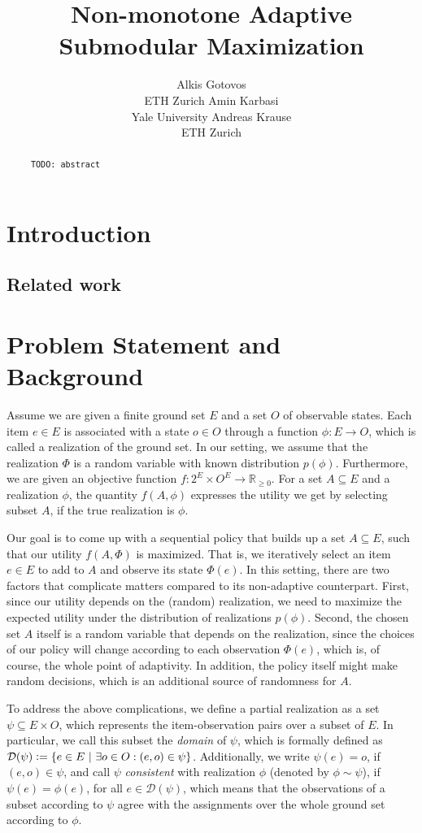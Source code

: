 \documentclass{article}
\title{Non-monotone Adaptive Submodular Maximization}
\author{Alkis Gotovos\\
ETH Zurich
\And
Amin Karbasi\\
Yale University
\And
Andreas Krause\\
ETH Zurich}
\newcommand{\todo}[1]{\noindent\texttt{\small\color[rgb]{0.5,0.1,0.1} TODO: #1}}
\newcommand{\dom}{\mathcal{D}}
\newcommand{\defeq}{\vcentcolon=}
\let\originalleft\left
\let\originalright\right
\renewcommand{\left}{\mathopen{}\mathclose\bgroup\originalleft}
\renewcommand{\right}{\aftergroup\egroup\originalright}
\newcommand{\smid}{\ \middle\vert\ }
\newcommand{\sdef}[2]{\left\{#1\smid#2\right\}}
\begin{document}
\maketitle

\begin{abstract}
\todo{abstract}
\end{abstract}

\section{Introduction}

\subsection{Related work}

\section{Problem Statement and Background}
Assume we are given a finite ground set $E$ and a set $O$ of observable states.
Each item $e \in E$ is associated with a state $o \in O$ through a function $\phi : E \to O$, which is called a realization of the ground set.
In our setting, we assume that the realization $\Phi$ is a random variable with known distribution $p(\phi)$.
Furthermore, we are given an objective function $f : 2^E \times O^E \to \mathbb{R}_{\geq 0}$.
For a set $A \subseteq E$ and a realization $\phi$, the quantity $f(A, \phi)$ expresses the utility we get by selecting subset $A$, if the true realization is $\phi$.

Our goal is to come up with a sequential policy that builds up a set $A \subseteq E$, such that our utility $f(A, \Phi)$ is maximized.
That is, we iteratively select an item $e \in E$ to add to $A$ and observe its state $\Phi(e)$.
In this setting, there are two factors that complicate matters compared to its non-adaptive counterpart.
First, since our utility depends on the (random) realization, we need to maximize the expected utility under the distribution of realizations $p(\phi)$.
Second, the chosen set $A$ itself is a random variable that depends on the realization, since the choices of our policy will change according to each observation $\Phi(e)$, which is, of course, the whole point of adaptivity.
In addition, the policy itself might make random decisions, which is an additional source of randomness for $A$.

To address the above complications, we define a partial realization as a set $ \psi \subseteq E \times O$, which represents the item-observation pairs over a subset of $E$.
In particular, we call this subset the \emph{domain} of $\psi$, which is formally defined as $\dom(\psi) \defeq \sdef{e \in E}{\exists o \in O : (e, o) \in \psi}$.
Additionally, we write $\psi(e) = o$, if $(e, o) \in \psi$, and call $\psi$ \emph{consistent} with realization $\phi$ (denoted by $\phi \sim \psi$), if $\psi(e) = \phi(e)$, for all $e \in \dom(\psi)$, which means that the observations of a subset according to $\psi$ agree with the assignments over the whole ground set according to $\phi$.
\end{document}
